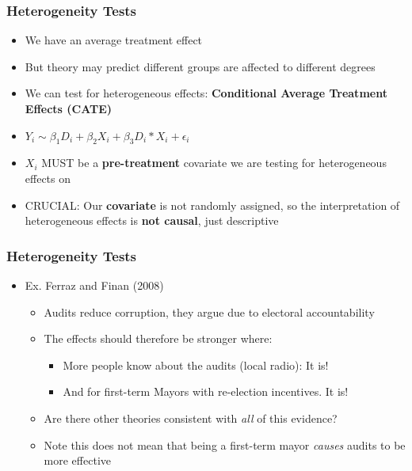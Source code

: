 \documentclass[xcolor=x11names,compress]{beamer}\usepackage[]{graphicx}\usepackage[]{color}
\renewcommand{\(}{\begin{columns}}
\renewcommand{\)}{\end{columns}}
\newcommand{\<}[1]{\begin{column}{#1}}
\renewcommand{\>}{\end{column}}
\begin{document}
\begin{frame}
\frametitle{Heterogeneity Tests}
\begin{itemize}
\item We have an average treatment effect
\pause
\item But theory may predict different groups are affected to different degrees
\pause
\item We can test for heterogeneous effects: \textbf{Conditional Average Treatment Effects (CATE)}
\pause
\item $Y_i \sim \beta_1 D_i + \beta_2 X_i + \beta_3 D_i*X_i + \epsilon_i$
\pause
\item $X_i$ MUST be a \textbf{pre-treatment} covariate we are testing for heterogeneous effects on
\pause
\item CRUCIAL: Our \textbf{covariate} is not randomly assigned, so the interpretation of heterogeneous effects is \textbf{not causal}, just descriptive
\end{itemize}
\end{frame}

\begin{frame}
\frametitle{Heterogeneity Tests}
\begin{itemize}
\item Ex. Ferraz and Finan (2008)
\begin{itemize}
\item Audits reduce corruption, they argue due to electoral accountability
\pause
\item The effects should therefore be stronger where:
\pause
\begin{itemize}
\item More people know about the audits (local radio): It is!
\pause
\item And for first-term Mayors with re-election incentives. It is!
\end{itemize}
\item Are there other theories consistent with \textit{all} of this evidence?
\pause
\item Note this does not mean that being a first-term mayor \textit{causes} audits to be more effective
\end{itemize}
\end{itemize}
\end{frame}
\end{document}
